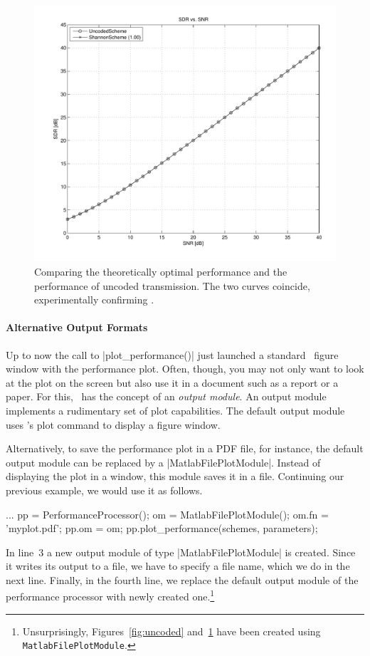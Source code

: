 \begin{figure}
  \begin{center}
    \includegraphics[width=\textwidth]{figures/matlab/ex_shannonscheme.pdf}
  \end{center}
  \caption{Comparing the theoretically optimal performance and the performance
  of uncoded transmission. The two curves coincide, experimentally confirming
  .}
  \label{fig:shannonscheme}
\end{figure}

\paragraph{Alternative Output Formats}

Up to now the call to |plot_performance()| just launched a standard \matlab\
figure window with the performance plot. Often, though, you may not only want to
look at the plot on the screen but also use it in a document such as a report or
a paper. For this, \jscsim\ has the concept of an \emph{output module}. An
output module implements a rudimentary set of plot capabilities. The default
output module uses \matlab's plot command to display a figure window.

Alternatively, to save the performance plot in a PDF file, for instance, the
default output module can be replaced by a |MatlabFilePlotModule|. Instead of
displaying the plot in a window, this module saves it in a file. Continuing our
previous example, we would use it as follows.
\begin{Code}
  ...  %
  pp = PerformanceProcessor();
  om = MatlabFilePlotModule();
  om.fn = 'myplot.pdf';
  pp.om = om;
  pp.plot_performance(schemes, parameters);  %
\end{Code}
In line~3 a new output module of type |MatlabFilePlotModule| is
created. Since it writes its output to a file, we have to specify a file name,
which we do in the next line. Finally, in the fourth line, we replace the
default output module of the performance processor with newly created
one.\footnote{Unsurprisingly, Figures~\ref{fig:uncoded}
and~\ref{fig:shannonscheme} have been created using
\Verb+MatlabFilePlotModule+.}

